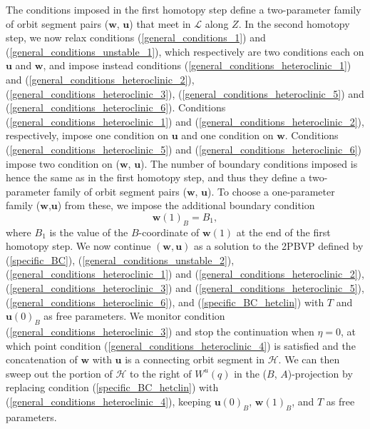 \documentclass{ws-ijbc}
\begin{document}
The conditions imposed in the first homotopy step define a two-parameter family of orbit segment pairs ($\mathbf{w}$, $\mathbf{u}$) that meet in $\mathscr{L}$ along $Z$.  In the second homotopy step, we now relax conditions (\ref{general_conditions_1}) and (\ref{general_conditions_unstable_1}), which respectively are two conditions each on $\mathbf{u}$ and $\mathbf{w}$, and impose instead conditions (\ref{general_conditions_heteroclinic_1}) and (\ref{general_conditions_heteroclinic_2}), (\ref{general_conditions_heteroclinic_3}), (\ref{general_conditions_heteroclinic_5}) and (\ref{general_conditions_heteroclinic_6}).    Conditions (\ref{general_conditions_heteroclinic_1}) and  (\ref{general_conditions_heteroclinic_2}), respectively, impose one condition on $\mathbf{u}$ and one condition on $\mathbf{w}$.  Conditions  (\ref{general_conditions_heteroclinic_5}) and (\ref{general_conditions_heteroclinic_6}) impose two condition on ($\mathbf{w}$, $\mathbf{u}$).  The number of boundary conditions imposed is hence the same as in the first homotopy step, and thus they define a two-parameter family of orbit segment pairs ($\mathbf{w}$, $\mathbf{u}$).  To choose a one-parameter family ($\mathbf{w}$,$\mathbf{u}$) from these, we impose the additional boundary condition 
	\begin{equation}
		\mathbf{w}(1)_B = B_1,
		\label{specific_BC_hetclin}
	\end{equation}
where $B_1$ is the value of the $B$-coordinate of $\mathbf{w}(1)$ at the end of the first homotopy step.  We now continue $(\mathbf{w}, \mathbf{u})$ as a solution to the 2PBVP defined by (\ref{specific_BC}), (\ref{general_conditions_unstable_2}), (\ref{general_conditions_heteroclinic_1}) and (\ref{general_conditions_heteroclinic_2}), (\ref{general_conditions_heteroclinic_3}) and (\ref{general_conditions_heteroclinic_5}), (\ref{general_conditions_heteroclinic_6}), and (\ref{specific_BC_hetclin}) with $T$ and $\mathbf{u}(0)_B$ as free parameters.  We monitor condition (\ref{general_conditions_heteroclinic_3}) and stop the continuation when $\eta=0$, at which point condition (\ref{general_conditions_heteroclinic_4}) is satisfied and the concatenation of $\mathbf{w}$ with $\mathbf{u}$ is a connecting orbit segment in $\mathscr{H}$.  We can then sweep out the portion of $\mathscr{H}$ to the right of $W^u(q)$ in the ($B$, $A$)-projection by replacing condition (\ref{specific_BC_hetclin}) with (\ref{general_conditions_heteroclinic_4}), keeping $\mathbf{u}(0)_B$, $\mathbf{w}(1)_B$, and $T$ as free parameters.
\end{document}
